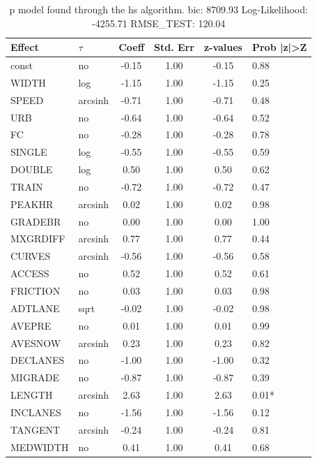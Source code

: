 \begin{table}
	\caption{p model found through the hs algorithm. bic: 8709.93 Log-Likelihood: -4255.71 RMSE_TEST: 120.04}
	\begin{center}
		\begin{tabular}{|l|l|c|c|c|l|}
			\hline
			Effect & $\tau$ & Coeff & Std. Err & z-values & Prob |z|>Z \\
			\hline
			const & no & -0.15 & 1.00 & -0.15 & 0.88 \\
			\hline
			WIDTH & log & -1.15 & 1.00 & -1.15 & 0.25 \\
			\hline
			SPEED & arcsinh & -0.71 & 1.00 & -0.71 & 0.48 \\
			\hline
			URB & no & -0.64 & 1.00 & -0.64 & 0.52 \\
			\hline
			FC & no & -0.28 & 1.00 & -0.28 & 0.78 \\
			\hline
			SINGLE & log & -0.55 & 1.00 & -0.55 & 0.59 \\
			\hline
			DOUBLE & log & 0.50 & 1.00 & 0.50 & 0.62 \\
			\hline
			TRAIN & no & -0.72 & 1.00 & -0.72 & 0.47 \\
			\hline
			PEAKHR & arcsinh & 0.02 & 1.00 & 0.02 & 0.98 \\
			\hline
			GRADEBR & no & 0.00 & 1.00 & 0.00 & 1.00 \\
			\hline
			MXGRDIFF & arcsinh & 0.77 & 1.00 & 0.77 & 0.44 \\
			\hline
			CURVES & arcsinh & -0.56 & 1.00 & -0.56 & 0.58 \\
			\hline
			ACCESS & no & 0.52 & 1.00 & 0.52 & 0.61 \\
			\hline
			FRICTION & no & 0.03 & 1.00 & 0.03 & 0.98 \\
			\hline
			ADTLANE & sqrt & -0.02 & 1.00 & -0.02 & 0.98 \\
			\hline
			AVEPRE & no & 0.01 & 1.00 & 0.01 & 0.99 \\
			\hline
			AVESNOW & arcsinh & 0.23 & 1.00 & 0.23 & 0.82 \\
			\hline
			DECLANES & no & -1.00 & 1.00 & -1.00 & 0.32 \\
			\hline
			MIGRADE & no & -0.87 & 1.00 & -0.87 & 0.39 \\
			\hline
			LENGTH & arcsinh & 2.63 & 1.00 & 2.63 & 0.01* \\
			\hline
			INCLANES & no & -1.56 & 1.00 & -1.56 & 0.12 \\
			\hline
			TANGENT & arcsinh & -0.24 & 1.00 & -0.24 & 0.81 \\
			\hline
			MEDWIDTH & no & 0.41 & 1.00 & 0.41 & 0.68 \\

\end{tabular}
\end{center}
\end{table}
